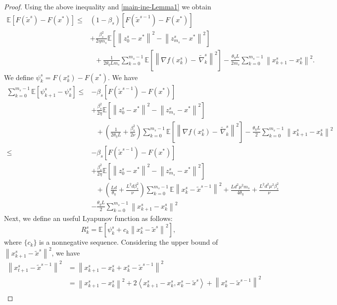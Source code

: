 \documentclass{article}
\newcommand*{\E}{\mathbb{E}}
\newcommand*{\VRG}{\,\widetilde{\nabla}_k^s}
\newcommand{\norm}[1]{\left\lVert#1\right\rVert}
\newcommand{\Iprod}[2]{\left\langle #1,#2\right\rangle}
\theoremstyle{definition}
\theoremstyle{remark}
\begin{document}
\begin{proof}
Using the above inequality and \eqref{main-ine-Lemma1} we obtain
\begin{equation}
\begin{split}
\E[F(\widetilde{x}^s)-F(x^*)] \leq &(1-\beta_s)[F(\widetilde{x}^{s-1})-F(x^*)] \\
&+ {\frac{ \beta_s^2}{2\eta m_s}}\E[\norm{z_{0}^s-x^*}^2-\norm{z_{m_s}^s-x^*}^2]\\
&~~~+\frac{1}{2\theta_{\eta} Lm_s}\sum_{k=0}^{m_s-1}\E\left[\norm{\nabla f(x_{k}^s)-\VRG}^2\right]-\frac{\theta_{\eta} L}{2m_s}\sum_{k=0}^{m_s-1}\norm{x_{k+1}^s-x_{k}^s}^2. 
\end{split}
\end{equation}
We define $\psi_k^s = F({x}^s_k)-F(x^*)$. We have
\begin{equation}
\begin{split}
\sum_{k=0}^{m_s-1}\E[\psi_{k+1}^s - \psi_k^s] \leq &-\beta_s[F(\widetilde{x}^{s-1})-F(x^*)] \\
&+ {\frac{ \beta_s^2}{2\eta}}\E[\norm{z_{0}^s-x^*}^2-\norm{z_{m_s}^s-x^*}^2]\\
&~~~+(\frac{1}{2\theta_{\eta} L}+\frac{\beta_s^2}{2\nu})\sum_{k=0}^{m_s-1}\E\left[\norm{\nabla f(x_{k}^s)-\VRG}^2\right]-\frac{\theta_{\eta} L}{2}\sum_{k=0}^{m_s-1}\norm{x_{k+1}^s-x_{k}^s}^2\\
\leq &-\beta_s[F(\widetilde{x}^{s-1})-F(x^*)] \\
&+ {\frac{ \beta_s^2}{2\eta}}\E[\norm{z_{0}^s-x^*}^2-\norm{z_{m_s}^s-x^*}^2]\\
&~~~+(\frac{Ld}{\theta_{\eta}}+\frac{L^2d\beta_s^2}{\nu})\sum_{k=0}^{m_s-1} \E\norm{x_k^s-\widetilde{x}^{s-1}}^2+\frac{Ld^2\mu^2m_s}{4\theta_{\eta}}+\frac{L^2d^2\mu^2\beta_s^2}{\nu}\\
&-\frac{\theta_{\eta} L}{2}\sum_{k=0}^{m_s-1}\norm{x_{k+1}^s-x_{k}^s}^2
\end{split}
\end{equation}
Next, we define an useful Lyapunov function as follows:
\begin{equation}
R_k^s = \E\left[\psi_{k}^s+ c_k\norm{x_k^s-\tilde{x}^s}^2\right],
\end{equation}
where $\{c_k\}$ is a nonnegative sequence. Considering the upper bound of $\norm{x_{k+1}^s-\widetilde{x}^s}^2$, we have
\begin{equation}
\begin{split}
\norm{x_{t+1}^s-\widetilde{x}^{s-1}}^2 &= \norm{x_{k+1}^s-x_k^s+x_k^s-\widetilde{x}^{s-1}}^2\\
&=\norm{x_{k+1}^s-x_k^s}^2+2\Iprod{x_{k+1}^s-x_k^s}{x_k^s-\widetilde{x}^s}+\norm{x_k^s-\widetilde{x}^{s-1}}^2\\

\end{split}
\end{equation}
\end{proof}
\end{document}
